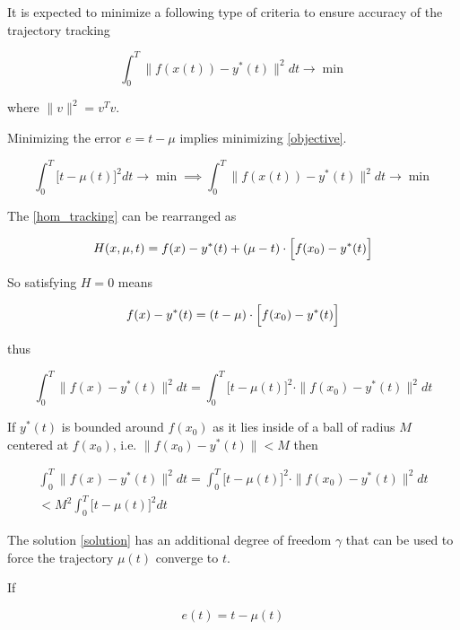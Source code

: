 \documentclass[11pt,american]{article}
\theoremstyle{definition}
\theoremstyle{plain}
\theoremstyle{remark}
\begin{document}
It is expected to minimize a following type of criteria to ensure accuracy of the trajectory tracking
  
\begin{equation}\label{objective}
\int_0^T \| f(x(t)) - y^*(t) \|^2 dt \to \min
\end{equation}

where $\| v \|^2 = v^T v$.

Minimizing the error $e = t - \mu$ implies minimizing \eqref{objective}.

\begin{equation}
\int_0^T \bigl[ t - \mu(t) \bigr]^2 dt \to \min  \implies  \int_0^T \| f(x(t)) - y^*(t) \|^2 dt \to \min
\end{equation}

The \eqref{hom_tracking} can be rearranged as

\begin{equation}
H(x,\mu, t) = f(x) - y^*(t) + (\mu - t) \cdot \Bigl[ f(x_0) - y^*(t) \Bigr] 
\end{equation}

So satisfying $H = 0$ means

\begin{equation}
f(x) - y^*(t) = (t - \mu) \cdot \Bigl[ f(x_0) - y^*(t) \Bigr] 
\end{equation}

thus

\begin{equation}
\int_0^T \| f(x) - y^*(t) \|^2 dt = \int_0^T \bigl[ t - \mu(t) \bigr]^2 \cdot \| f(x_0) - y^*(t) \|^2 dt
\end{equation}

If $y^*(t)$ is bounded around $f(x_0)$ as it lies inside of a ball of radius $M$ centered at $f(x_0)$, i.e. $\|f(x_0) - y^*(t)\| < M$ then

\begin{gather}
\int_0^T \| f(x) - y^*(t) \|^2 dt = \int_0^T \bigl[ t - \mu(t) \bigr]^2 \cdot \| f(x_0) - y^*(t) \|^2 dt \\
< M^2 \int_0^T \bigl[ t - \mu(t) \bigr]^2 dt
\end{gather}

The solution \eqref{solution} has an additional degree of freedom $\gamma$ that can be used to force the trajectory $\mu(t)$ converge to $t$. 

If 

\begin{equation}
e(t) = t - \mu(t)
\end{equation}
\end{document}
